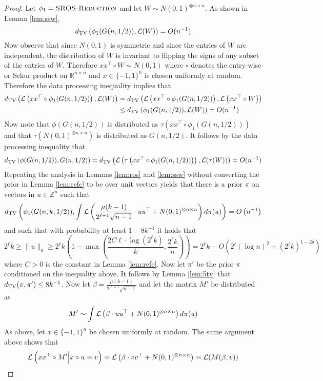 \begin{proof}
Let $\phi_1 = \textsc{SROS-Reduction}$ and let $W \sim N(0, 1)^{\otimes n \times n}$. As shown in Lemma \ref{lem:ssw},
$$d_{\text{TV}}\left( \phi_1(G(n,1/2)), \mathcal{L}(W) \right) = O( n^{-1} )$$
Now observe that since $N(0, 1)$ is symmetric and since the entries of $W$ are independent, the distribution of $W$ is invariant to flipping the signs of any subset of the entries of $W$. Therefore $xx^\top \circ W \sim N(0, 1)$ where $\circ$ denotes the entry-wise or Schur product on $\mathbb{R}^{n \times n}$ and $x \in \{-1, 1\}^n$ is chosen uniformly at random. Therefore the data processing inequality implies that
\begin{align*}
d_{\text{TV}}\left( \mathcal{L}\left( xx^\top \circ \phi_1(G(n,1/2)) \right), \mathcal{L}(W) \right) &= d_{\text{TV}}\left( \mathcal{L}\left( xx^\top \circ \phi_1(G(n,1/2)) \right), \mathcal{L}\left( xx^\top \circ W\right) \right) \\
&\le d_{\text{TV}}\left( \phi_1(G(n,1/2)), \mathcal{L}(W) \right) = O( n^{-1} )
\end{align*}
Now note that $\phi(G(n, 1/2))$ is distributed as $\tau\left( xx^\top \circ \phi_1(G(n,1/2)) \right)$ and that $\tau\left(N(0, 1)^{\otimes n \times n}\right)$ is distributed as $G(n, 1/2)$. It follows by the data processing inequality that
$$d_{\text{TV}}\left( \phi(G(n, 1/2)), G(n, 1/2) \right) = d_{\text{TV}}\left( \mathcal{L}\left( \tau\left( xx^\top \circ \phi_1(G(n,1/2)) \right)\right), \mathcal{L}(\tau(W)) \right) = O(n^{-1})$$
Repeating the analysis in Lemmas \ref{lem:ros} and \ref{lem:ssw} without converting the prior in Lemma \ref{lem:refc} to be over unit vectors yields that there is a prior $\pi$ on vectors in $u \in \mathbb{Z}^n$ such that
$$d_{\text{TV}}\left( \phi_1(G(n, k, 1/2)), \int \mathcal{L}\left( \frac{\mu (k-1)}{2^{\ell + 1}\sqrt{n-1}} \cdot  uu^\top + N(0, 1)^{\otimes n \times n} \right) d\pi(u) \right) = O\left( n^{-1} \right)$$
and such that with probability at least $1 - 8k^{-1}$ it holds that
$$2^\ell k \ge \| u \|_0 \ge 2^{\ell} k \left( 1 - \max \left( \frac{2C \ell \cdot \log(2^\ell k)}{k}, \frac{2^\ell k}{n} \right) \right) = 2^{\ell} k - O\left( 2^\ell (\log n)^2 + (2^\ell k)^{1-2\delta} \right)$$
where $C > 0$ is the constant in Lemma \ref{lem:refc}. Now let $\pi'$ be the prior $\pi$ conditioned on the inequality above. It follows by Lemma \ref{lem:5tv} that $d_{\text{TV}}( \pi, \pi') \le 8k^{-1}$. Now let $\beta = \frac{\mu (k-1)}{2^{\ell + 1}\sqrt{n-1}}$ and let the matrix $M'$ be distributed as
$$M' \sim \int \mathcal{L}\left( \beta \cdot  uu^\top + N(0, 1)^{\otimes n \times n} \right) d\pi(u)$$
As above, let $x \in \{-1, 1\}^n$ be chosen uniformly at random. The same argument above shows that
$$\mathcal{L}\left( xx^\top \circ M' \Big| x \circ u = v \right) = \mathcal{L}\left( \beta \cdot vv^\top + N(0, 1)^{\otimes n \times n}\right) = \mathcal{L}(M(\beta, v))$$

\end{proof}
